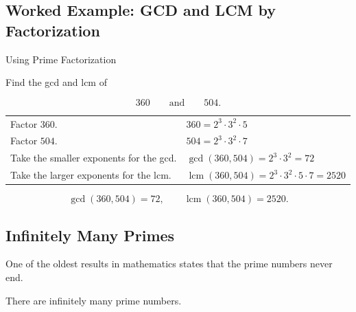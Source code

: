 \subsection{Worked Example: GCD and LCM by Factorization}
\label{subsec:worked-gcd-lcm-factorization}

\begin{workedexamplebox}{Using Prime Factorization}

Find the gcd and lcm of

\[ 360\qquad\text{and}\qquad504. \]

\begin{tabularx}{\textwidth}{@{}>{\raggedright\arraybackslash}p{}X@{}}
Factor \(360\). &
\(360=2^3\cdot3^2\cdot5\)\\
Factor \(504\). &
\(504=2^3\cdot3^2\cdot7\)\\
Take the smaller exponents for the gcd. &
\(\gcd(360,504)=2^3\cdot3^2=72\)\\
Take the larger exponents for the lcm. &
\(\operatorname{lcm}(360,504)=2^3\cdot3^2\cdot5\cdot7=2520\)
\end{tabularx}

\begin{answerbox}
\[ \boxed{\gcd(360,504)=72,\qquad\operatorname{lcm}(360,504)=2520.} \]
\end{answerbox}
\end{workedexamplebox}

\subsection{Infinitely Many Primes}
\label{subsec:infinitely-many-primes}

One of the oldest results in mathematics states that the prime numbers never
end.

\begin{theorem}[Euclid]
There are infinitely many prime numbers.
\end{theorem}

